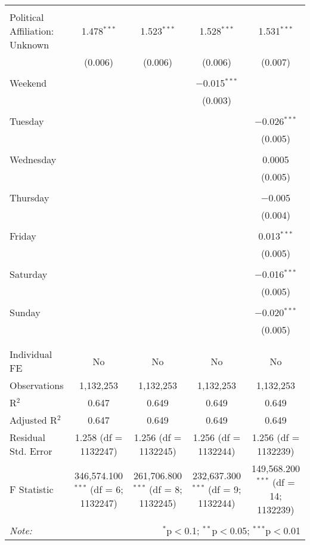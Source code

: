 \documentclass[
]{article}
\begin{document}
\begin{table}[!htbp]
{\begin{tabular}{@{\extracolsep{5pt}}lcccc}
  & & & & \\ 
 Political Affiliation: Unknown & 1.478$^{***}$ & 1.523$^{***}$ & 1.528$^{***}$ & 1.531$^{***}$ \\ 
  & (0.006) & (0.006) & (0.006) & (0.007) \\ 
  & & & & \\ 
 Weekend &  &  & $-$0.015$^{***}$ &  \\ 
  &  &  & (0.003) &  \\ 
  & & & & \\ 
 Tuesday &  &  &  & $-$0.026$^{***}$ \\ 
  &  &  &  & (0.005) \\ 
  & & & & \\ 
 Wednesday &  &  &  & 0.0005 \\ 
  &  &  &  & (0.005) \\ 
  & & & & \\ 
 Thursday &  &  &  & $-$0.005 \\ 
  &  &  &  & (0.004) \\ 
  & & & & \\ 
 Friday &  &  &  & 0.013$^{***}$ \\ 
  &  &  &  & (0.005) \\ 
  & & & & \\ 
 Saturday &  &  &  & $-$0.016$^{***}$ \\ 
  &  &  &  & (0.005) \\ 
  & & & & \\ 
 Sunday &  &  &  & $-$0.020$^{***}$ \\ 
  &  &  &  & (0.005) \\ 
  & & & & \\ 
\hline \\[-1.8ex] 
Individual FE & No & No & No & No \\ 
Observations & 1,132,253 & 1,132,253 & 1,132,253 & 1,132,253 \\ 
R$^{2}$ & 0.647 & 0.649 & 0.649 & 0.649 \\ 
Adjusted R$^{2}$ & 0.647 & 0.649 & 0.649 & 0.649 \\ 
Residual Std. Error & 1.258 (df = 1132247) & 1.256 (df = 1132245) & 1.256 (df = 1132244) & 1.256 (df = 1132239) \\ 
F Statistic & 346,574.100$^{***}$ (df = 6; 1132247) & 261,706.800$^{***}$ (df = 8; 1132245) & 232,637.300$^{***}$ (df = 9; 1132244) & 149,568.200$^{***}$ (df = 14; 1132239) \\ 
\hline 
\hline \\[-1.8ex] 
\textit{Note:}  & \multicolumn{4}{r}{$^{*}$p$<$0.1; $^{**}$p$<$0.05; $^{***}$p$<$0.01} \\ 
\end{tabular}
} 
\end{table} 
\newpage
\end{document}
